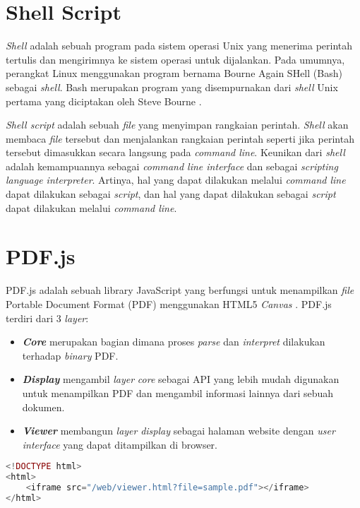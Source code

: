 \section{Shell Script}
\label{sec:shell}
\textit{Shell} adalah sebuah program pada sistem operasi Unix yang menerima perintah tertulis dan mengirimnya ke sistem operasi untuk dijalankan. Pada umumnya, perangkat Linux menggunakan program bernama Bourne Again SHell (Bash) sebagai \textit{shell}. Bash merupakan program yang disempurnakan dari \textit{shell} Unix pertama yang diciptakan oleh Steve Bourne \cite{linux}. 

\textit{Shell script} adalah sebuah \textit{file} yang menyimpan rangkaian perintah. \textit{Shell} akan membaca \textit{file} tersebut dan menjalankan rangkaian perintah seperti jika perintah tersebut dimasukkan secara langsung pada \textit{command line}. Keunikan dari \textit{shell} adalah kemampuannya sebagai \textit{command line interface} dan sebagai  \textit{scripting language interpreter}. Artinya, hal yang dapat dilakukan melalui \textit{command line} dapat dilakukan sebagai \textit{script}, dan hal yang dapat dilakukan sebagai \textit{script} dapat dilakukan melalui \textit{command line}.

\section{PDF.js}
\label{sec:pdfjs} 
PDF.js adalah sebuah library JavaScript yang berfungsi untuk menampilkan \textit{file} Portable Document Format (PDF) menggunakan HTML5 \textit{Canvas} \cite{pdfjs}. PDF.js terdiri dari 3 \textit{layer}:

\begin{itemize}
	\item \textit{\textbf{Core}} merupakan bagian dimana proses \textit{parse} dan \textit{interpret} dilakukan terhadap \textit{binary} PDF.
	\item \textit{\textbf{Display}} mengambil \textit{layer} \textit{core} sebagai API yang lebih mudah digunakan untuk menampilkan PDF dan mengambil informasi lainnya dari sebuah dokumen.
	\item \textit{\textbf{Viewer}} membangun \textit{layer} \textit{display} sebagai halaman website dengan \textit{user interface} yang dapat ditampilkan di browser.
\end{itemize}

\begin{lstlisting}[language=php, caption=Contoh kode untuk menggunakan PDF.js, label=kode:pdfjs]
<!DOCTYPE html>
<html>
    <iframe src="/web/viewer.html?file=sample.pdf"></iframe>
</html>
\end{lstlisting}


